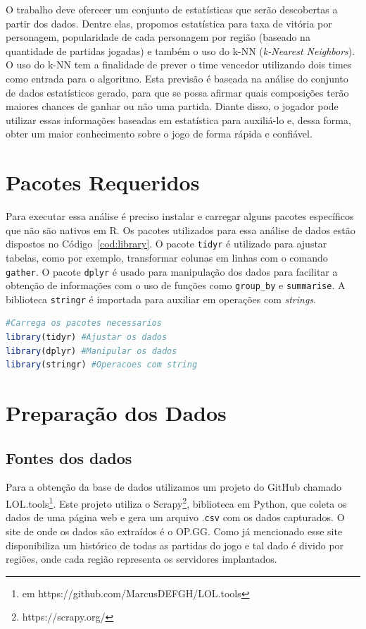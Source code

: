 \documentclass[a4paper]{article}
\begin{document}
O trabalho deve oferecer um conjunto de estatísticas que serão descobertas a partir dos dados. Dentre elas, propomos estatística para taxa de vitória por personagem, popularidade de cada personagem por região (baseado na quantidade de partidas jogadas) e também o uso do k-NN (\textit{k-Nearest Neighbors}). O uso do k-NN tem a finalidade de prever o time vencedor utilizando dois times como entrada para o algoritmo. Esta previsão é baseada na análise do conjunto de dados estatísticos gerado, para que se possa afirmar quais composições terão maiores chances de ganhar ou não uma partida. Diante disso, o jogador pode utilizar essas informações baseadas em estatística para auxiliá-lo e, dessa forma, obter um maior conhecimento sobre o jogo de forma rápida e confiável.

\section{Pacotes Requeridos}

Para executar essa análise é preciso instalar e carregar alguns pacotes específicos que não são nativos em R. Os pacotes utilizados para essa análise de dados estão dispostos no Código~\ref{cod:library}. O pacote \texttt{tidyr} é utilizado para ajustar tabelas, como por exemplo, transformar colunas em linhas com o comando \texttt{gather}. O pacote \texttt{dplyr} é usado para manipulação dos dados para facilitar a obtenção de informações com o uso de funções como \texttt{group\_by} e \texttt{summarise}. A biblioteca \texttt{stringr} é importada para auxiliar em operações com \textit{strings}.

\begin{lstlisting}[language=R, caption={Pacotes utilizados no projeto},label={cod:library}]
#Carrega os pacotes necessarios
library(tidyr) #Ajustar os dados
library(dplyr) #Manipular os dados
library(stringr) #Operacoes com string
\end{lstlisting}

\section{Preparação dos Dados}

\subsection{Fontes dos dados}
Para a obtenção da base de dados utilizamos um projeto do GitHub chamado LOL.tools\footnote{em https://github.com/MarcusDEFGH/LOL.tools}. Este projeto utiliza o Scrapy\footnote{https://scrapy.org/}, biblioteca em Python, que coleta os dados de uma página web e gera um arquivo .\texttt{csv} com os dados capturados. O site de onde os dados são extraídos é o OP.GG. Como já mencionado esse site disponibiliza um histórico de todas as partidas do jogo e tal dado é divido por regiões, onde cada região representa os servidores implantados.
\end{document}
